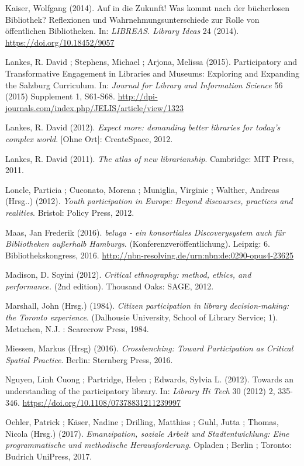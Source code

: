 \documentclass[a4paper,
fontsize=11pt,
oneside,
numbers=noperiodatend,
parskip=half-,
bibliography=totoc,
final
]{scrartcl}
\begin{document}
Kaiser, Wolfgang (2014). Auf in die Zukunft! Was kommt nach der
bücherlosen Bibliothek? Reflexionen und Wahrnehmungsunterschiede zur
Rolle von öffentlichen Bibliotheken. In: \emph{LIBREAS. Library Ideas}
24 (2014).
\href{http://dx.doi.org/10.18452/9057}{https://doi.org/10.18452/9057}

Lankes, R. David ; Stephens, Michael ; Arjona, Melissa (2015).
Participatory and Transformative Engagement in Libraries and Museums:
Exploring and Expanding the Salzburg Curriculum. In: \emph{Journal for
Library and Information Science} 56 (2015) Supplement 1, S61-S68.
\url{http://dpi-journals.com/index.php/JELIS/article/view/1323}

Lankes, R. David (2012). \emph{Expect more: demanding better libraries
for today's complex world}. {[}Ohne Ort{]}: CreateSpace, 2012.

Lankes, R. David (2011). \emph{The atlas of new librarianship}.
Cambridge: MIT Press, 2011.

Loncle, Particia ; Cuconato, Morena ; Muniglia, Virginie ; Walther,
Andreas (Hrsg..) (2012). \emph{Youth participation in Europe: Beyond
discourses, practices and realities}. Bristol: Policy Press, 2012.

Maas, Jan Frederik (2016). \emph{beluga - ein konsortiales
Discoverysystem auch für Bibliotheken außerhalb Hamburgs}.
(Konferenzveröffentlichung). Leipzig: 6. Bibliothekskongress, 2016.
\url{http://nbn-resolving.de/urn:nbn:de:0290-opus4-23625}

Madison, D. Soyini (2012). \emph{Critical ethnography: method, ethics,
and performance.} (2nd edition). Thousand Oaks: SAGE, 2012.

Marshall, John (Hrsg.) (1984). \emph{Citizen participation in library
decision-making: the Toronto experience}. (Dalhousie University, School
of Library Service; 1). Metuchen, N.J. : Scarecrow Press, 1984.

Miessen, Markus (Hrsg) (2016). \emph{Crossbenching: Toward Participation
as Critical Spatial Practice}. Berlin: Sternberg Press, 2016.

Nguyen, Linh Cuong ; Partridge, Helen ; Edwards, Sylvia L. (2012).
Towards an understanding of the participatory library. In: \emph{Library
Hi Tech} 30 (2012) 2, 335-346.
\url{https://doi.org/10.1108/07378831211239997}

Oehler, Patrick ; Käser, Nadine ; Drilling, Matthias ; Guhl, Jutta ;
Thomas, Nicola (Hrsg.) (2017). \emph{Emanzipation, soziale Arbeit und
Stadtentwicklung: Eine programmatische und methodische Herausforderung}.
Opladen ; Berlin ; Toronto: Budrich UniPress, 2017.
\end{document}
